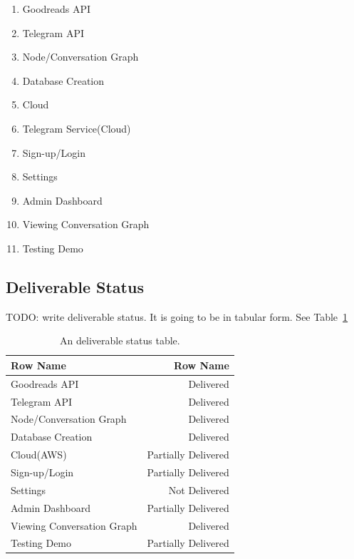 \documentclass[a4paper]{article}
\begin{document}
\begin{enumerate}

   \item 	Goodreads API
   
   \item 	Telegram API	
     
   \item  Node/Conversation Graph
    
   \item Database Creation	
   
 	\item 	Cloud
 	
 	\item Telegram Service(Cloud)

 	 
 	\item 	Sign-up/Login
 	
 	\item 	Settings
 	
 	\item	Admin Dashboard
 	
 		\item	Viewing Conversation Graph
 			\item	Testing Demo	
 			
 \end{enumerate}

\subsection{Deliverable Status}
TODO: write deliverable status. It is going to be in tabular form. See Table~\ref{tab:deliverablestatus}

\begin{table}
\centering
\begin{tabular}{l|r}
Row Name & Row Name \\\hline
Goodreads API & Delivered \\
Telegram API & Delivered \\
Node/Conversation Graph & Delivered \\
Database Creation	 & Delivered \\
Cloud(AWS) & Partially Delivered \\
Sign-up/Login & Partially Delivered \\
Settings & Not Delivered\\
Admin Dashboard & Partially Delivered \\
Viewing Conversation Graph & Delivered \\
Testing Demo & Partially Delivered
\end{tabular}
\caption{\label{tab:deliverablestatus}An deliverable status table.}
\end{table}
\end{document}

